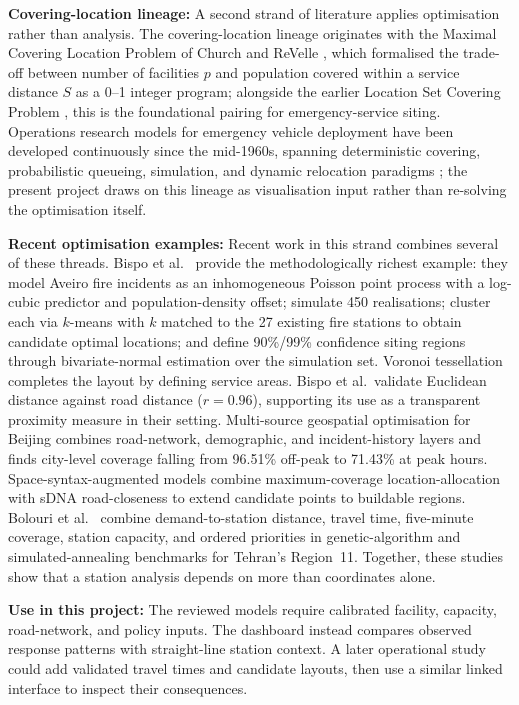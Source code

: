 \textbf{Covering-location lineage:} A second strand of literature applies optimisation rather than analysis. The covering-location lineage originates with the Maximal Covering Location Problem of Church and ReVelle \cite{church1974}, which formalised the trade-off between number of facilities $p$ and population covered within a service distance $S$ as a 0--1 integer program; alongside the earlier Location Set Covering Problem \cite{toregas1971}, this is the foundational pairing for emergency-service siting. Operations research models for emergency vehicle deployment have been developed continuously since the mid-1960s, spanning deterministic covering, probabilistic queueing, simulation, and dynamic relocation paradigms \cite{goldberg2004}; the present project draws on this lineage as visualisation input rather than re-solving the optimisation itself.

\textbf{Recent optimisation examples:} Recent work in this strand combines several of these threads. Bispo et al.\ \cite{reconfig2023} provide the methodologically richest example: they model Aveiro fire incidents as an inhomogeneous Poisson point process with a log-cubic predictor and population-density offset; simulate 450 realisations; cluster each via $k$-means with $k$ matched to the 27 existing fire stations to obtain candidate optimal locations; and define 90\%/99\% confidence siting regions through bivariate-normal estimation over the simulation set. Voronoi tessellation completes the layout by defining service areas. Bispo et al.\ validate Euclidean distance against road distance ($r = 0.96$), supporting its use as a transparent proximity measure in their setting. Multi-source geospatial optimisation for Beijing \cite{beijing2021} combines road-network, demographic, and incident-history layers and finds city-level coverage falling from 96.51\% off-peak to 71.43\% at peak hours. Space-syntax-augmented models \cite{spacesyntax2023} combine maximum-coverage location-allocation with sDNA road-closeness to extend candidate points to buildable regions. Bolouri et al.\ \cite{ocmola2018} combine demand-to-station distance, travel time, five-minute coverage, station capacity, and ordered priorities in genetic-algorithm and simulated-annealing benchmarks for Tehran's Region~11. Together, these studies show that a station analysis depends on more than coordinates alone.

\textbf{Use in this project:} The reviewed models require calibrated facility, capacity, road-network, and policy inputs. The dashboard instead compares observed response patterns with straight-line station context. A later operational study could add validated travel times and candidate layouts, then use a similar linked interface to inspect their consequences.

